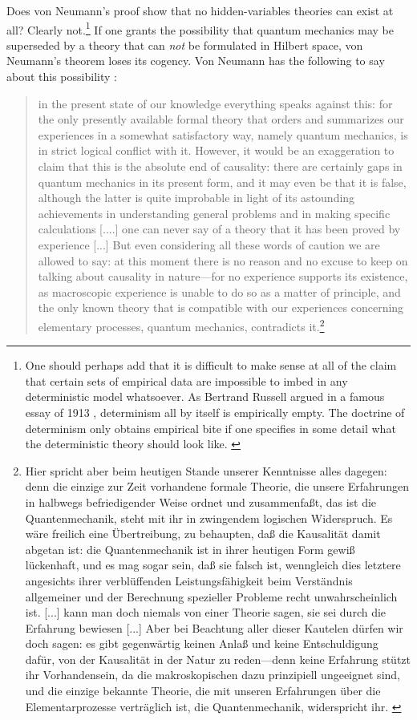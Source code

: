 \documentclass[12pt]{article}
\begin{document}
Does von Neumann's proof show that no hidden-variables theories can exist at all? Clearly not.\footnote{One should perhaps add that it is difficult to make sense at all of the claim that certain sets of empirical data are impossible to imbed in any deterministic model whatsoever. As Bertrand Russell argued in a famous essay of 1913 \cite{russell}, determinism all by itself is empirically empty. The doctrine of determinism only obtains empirical bite if one specifies in some detail what the deterministic theory should look like. \label{Noteunderdet}} If one grants the possibility that quantum mechanics may be superseded by a theory that can \emph{not} be formulated in Hilbert space, von Neumann's theorem loses its cogency. Von Neumann has the following to say about this possibility \cite[p.\@ 173]{VN1}:
\begin{quote}
  in the present state of our knowledge everything speaks against this: for the only presently available formal theory that orders and summarizes our experiences in a somewhat satisfactory way, namely quantum mechanics, is in strict logical conflict with it. However, it would be an exaggeration to claim that this is the absolute end of causality: there are certainly gaps in quantum mechanics in its present form, and it may even be that it is false, although the latter is quite improbable in light of its astounding achievements in understanding general problems and in making specific calculations [....] one can never say of a theory that it has been proved by experience [...] But even considering all these words of caution we are allowed to say: at this moment there is no reason and no excuse to keep on talking about causality in nature---for no experience supports its existence, as macroscopic experience is unable to do so as a matter of principle, and the only known theory that is compatible with our experiences concerning elementary processes, quantum mechanics, contradicts it.\footnote{Hier spricht aber beim heutigen Stande unserer Kenntnisse alles dagegen: denn die einzige zur Zeit vorhandene formale Theorie, die unsere Erfahrungen in halbwegs befriedigender Weise ordnet und zusammenfa{\ss}t, das ist die Quantenmechanik, steht mit ihr in zwingendem logischen Widerspruch. Es w\"{a}re freilich eine \"{U}bertreibung, zu behaupten, da{\ss} die Kausalit\"{a}t damit abgetan ist: die Quantenmechanik ist in ihrer heutigen Form gewi{\ss} l\"{u}ckenhaft, und es mag sogar sein, da{\ss} sie falsch ist, wenngleich dies letztere angesichts ihrer verbl\"{u}ffenden Leistungsf\"{a}higkeit beim Verst\"{a}ndnis allgemeiner und der Berechnung spezieller Probleme recht unwahrscheinlich ist. [...] kann man doch niemals von einer Theorie sagen, sie sei durch die Erfahrung bewiesen [...] Aber bei Beachtung aller dieser Kautelen d\"{u}rfen wir doch sagen: es gibt gegenw\"{a}rtig keinen Anla{\ss} und keine Entschuldigung daf\"{u}r, von der Kausalit\"{a}t in der Natur zu reden---denn keine Erfahrung st\"{u}tzt ihr Vorhandensein, da die makroskopischen dazu prinzipiell ungeeignet sind, und die einzige bekannte Theorie, die mit unseren Erfahrungen \"{u}ber die Elementarprozesse vertr\"{a}glich ist, die Quantenmechanik, widerspricht ihr. \label{notevN}}
\end{quote}
\end{document}
